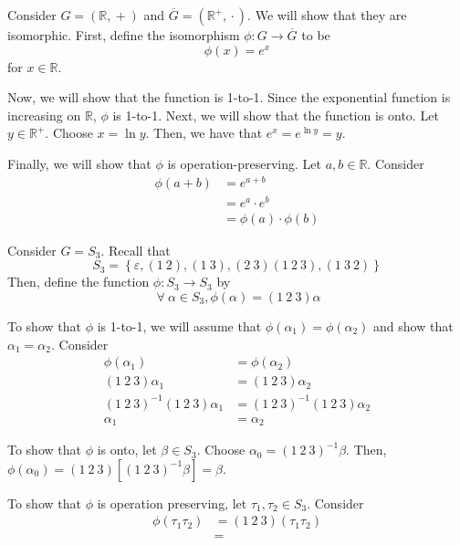 \begin{nexample}
    Consider \(G = (\mathbb{R}, {}+{})\) and \(\overline{G} = (\mathbb{R}^+, {}\cdot{})\). We will show that they are isomorphic. First, define the isomorphism \(\phi: G \to \overline{G}\) to be
    \[
        \phi(x) = e^x
    \]
    for \(x \in \mathbb{R}\).

    Now, we will show that the function is 1-to-1. Since the exponential function is increasing on \(\mathbb{R}\), \(\phi\) is 1-to-1. Next, we will show that the function is onto. Let \(y \in \mathbb{R}^+\). Choose \(x = \ln y\). Then, we have that \(e^x = e^{\ln y} = y\).

    Finally, we will show that \(\phi\) is operation-preserving. Let \(a, b \in \mathbb{R}\). Consider
    \[
    \begin{aligned}
        \phi(a+b) &= e^{a+b} \\
                  &= e^a \cdot e^b \\
                  &= \phi(a) \cdot \phi(b)
    \end{aligned}
    \]
\end{nexample}

\begin{nexample}
    Consider \(G = S_3\). Recall that 
    \[
        S_3 = \left\{\varepsilon, (1\ 2), (1\ 3), (2\ 3) (1\ 2\ 3), (1\ 3\ 2)\right\}
    \]
    Then, define the function \(\phi: S_3 \to S_3\) by
    \[
        \ \forall \ \alpha \in S_3, \phi(\alpha) = (1\ 2\ 3)\alpha
    \]

    To show that \(\phi\) is 1-to-1, we will assume that \(\phi(\alpha_1) = \phi(\alpha_2)\) and show that \(\alpha_1 = \alpha_2\). Consider
    \[
    \begin{aligned}
        \phi(\alpha_1) &= \phi(\alpha_2) \\
        (1\ 2\ 3)\alpha_1 &= (1\ 2\ 3)\alpha_2 \\
        (1\ 2\ 3)^{-1}(1\ 2\ 3) \alpha_1 &= (1\ 2\ 3)^{-1}(1\ 2\ 3) \alpha_2 \\
        \alpha_1 &= \alpha_2
    \end{aligned}
    \]

    To show that \(\phi\) is onto, let \(\beta \in S_3\). Choose \(\alpha_0 = (1\ 2\ 3)^{-1}\beta\). Then, \(\phi(\alpha_0) = (1\ 2\ 3)[(1\ 2\ 3)^{-1}\beta] = \beta\).

    To show that \(\phi\) is operation preserving, let \(\tau_1, \tau_2 \in S_3\). Consider 
    \[
    \begin{aligned}
        \phi(\tau_1 \tau_2) &= (1\ 2\ 3)(\tau_1 \tau_2) \\
                            &= 
    \end{aligned}
    \]
\end{nexample}

